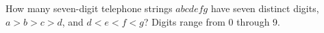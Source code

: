 How many seven-digit telephone strings $abcdefg$ have seven distinct digits, $a>b>c>d$, and $d<e<f<g$? Digits range from 0 through 9.

